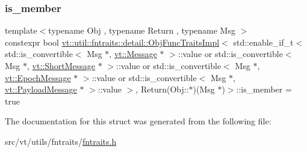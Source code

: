 \subsubsection{\texorpdfstring{is\+\_\+member}{is\_member}}
{\footnotesize\ttfamily template$<$typename Obj , typename Return , typename Msg $>$ \\
constexpr bool \hyperlink{structvt_1_1util_1_1fntraits_1_1detail_1_1_obj_func_traits_impl}{vt\+::util\+::fntraits\+::detail\+::\+Obj\+Func\+Traits\+Impl}$<$ std\+::enable\+\_\+if\+\_\+t$<$ std\+::is\+\_\+convertible$<$ Msg $\ast$, \hyperlink{namespacevt_a3a3ddfef40b4c90915fa43cdd5f129ea}{vt\+::\+Message} $\ast$ $>$\+::value or std\+::is\+\_\+convertible$<$ Msg $\ast$, \hyperlink{namespacevt_a1125ac1da6c0bbf141e0ea0739d7602d}{vt\+::\+Short\+Message} $\ast$ $>$\+::value or std\+::is\+\_\+convertible$<$ Msg $\ast$, \hyperlink{namespacevt_ad67368ffae52d7325002586b41bb150e}{vt\+::\+Epoch\+Message} $\ast$ $>$\+::value or std\+::is\+\_\+convertible$<$ Msg $\ast$, \hyperlink{namespacevt_a89a92229c5622b855c02c549f83a1a68}{vt\+::\+Payload\+Message} $\ast$ $>$\+::value $>$, Return(Obj\+::$\ast$)(Msg $\ast$)$>$\+::is\+\_\+member = true\hspace{0.3cm}{\ttfamily [static]}}



The documentation for this struct was generated from the following file\+:\begin{DoxyCompactItemize}
\item 
src/vt/utils/fntraits/\hyperlink{fntraits_8h}{fntraits.\+h}\end{DoxyCompactItemize}
